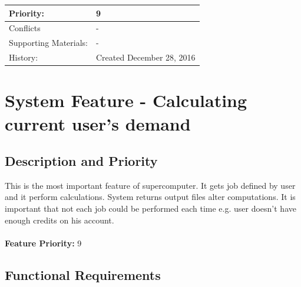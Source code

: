 \documentclass{scrreprt}
\begin{document}
\begin{table}[h!]
\begin{tabular}{|l|l|}
Priority:             & 9                                                                                                                                                                                                                                                                             \\ \hline
Conflicts             & -                                                                                                                                                                                                                                                                             \\ \hline
Supporting Materials: & -                                                                                                                                                                                                                                                                             \\ \hline
History:              & Created December 28, 2016                                                                                                                                                                                                                                                     \\ \hline
\end{tabular}
\end{table}



\section{System Feature - Calculating current user's demand }



\subsection{Description and Priority}
This is the most important feature of supercomputer. It gets job defined by user and it perform calculations. System returns output files alter computations. It is important that not each job could be performed each time e.g. user doesn't have enough credits on his account.
\\
\\
\textbf{Feature Priority: } 9

\subsection{Functional Requirements}
\end{document}
